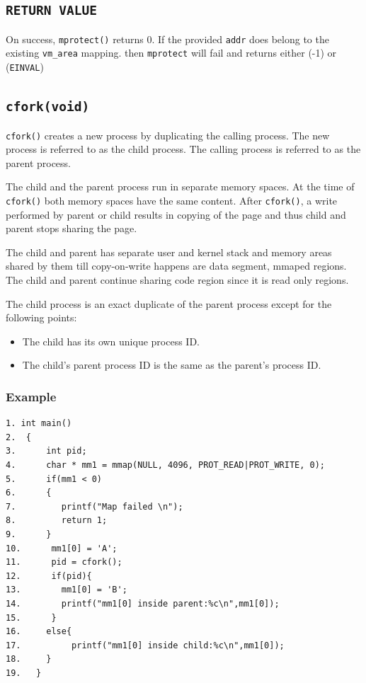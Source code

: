 \documentclass[12pt]{article}
\begin{document}
\subsection*{\tt RETURN VALUE}
    On success, {\tt mprotect()} returns 0. If the provided {\tt addr} does belong to the existing {\tt vm\_area} mapping. then {\tt mprotect} will fail and returns either (-1) or ({\tt EINVAL})
\newpage
\subsection*{\tt cfork(void)}    
\texttt{cfork()} creates a new process by duplicating the calling process.  The new process is referred to as the child process.  The calling process is referred to as the parent process.

The  child and the parent process run in separate memory spaces.  At the time of \texttt{cfork()} both memory spaces have the same content. After \texttt{cfork()}, a write performed by parent or child results in copying of the page and thus child and parent stops sharing the page. 

The child and parent has separate user and kernel stack and memory areas shared by them till copy-on-write happens are data segment, mmaped regions. The child and parent continue sharing code region since it is read only regions.


The child process is an exact duplicate of the parent process except for the following points:
 \begin{itemize}
 \item The child has its own unique process ID.
 \item The child's parent process ID is the same as the parent's process ID.
 \end{itemize}
 
\subsubsection*{Example}
\begin{verbatim}
1. int main()
2.  {
3.      int pid;
4.      char * mm1 = mmap(NULL, 4096, PROT_READ|PROT_WRITE, 0);
5.      if(mm1 < 0)
6.      {
7.         printf("Map failed \n");
8.         return 1;
9.      }
10.      mm1[0] = 'A';
11.      pid = cfork();
12.      if(pid){
13.        mm1[0] = 'B';
14.        printf("mm1[0] inside parent:%c\n",mm1[0]);
15.      }
16.     else{
17.          printf("mm1[0] inside child:%c\n",mm1[0]);
18.     }
19.   }
\end{verbatim}
\end{document}

